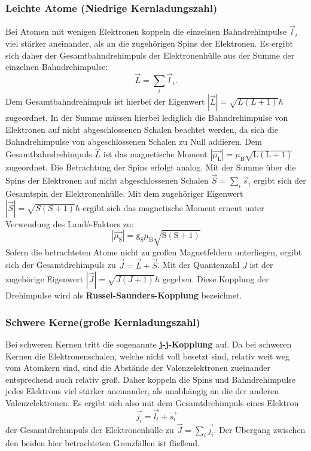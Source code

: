 \subsubsection{Leichte Atome (Niedrige Kernladungszahl)}
Bei Atomen mit wenigen Elektronen koppeln die einzelnen Bahndrehimpulse $\vec{l}_i$ viel stärker aneinander, als an die zugehörigen Spins der Elektronen. Es ergibt sich daher der Gesamtbahndrehimpuls der Elektronenhülle aus der Summe der einzelnen Bahndrehimpulse:
\begin{equation}
  \vec{L}=\sum_i{\vec{l}_i}\mathrm{.}
\end{equation}
Dem Gesamtbahndrehimpuls ist hierbei der Eigenwert $|\vec{L}|=\sqrt{L\left(L+1\right)} \hbar$ zugeordnet.
In der Summe müssen hierbei lediglich die Bahndrehimpulse von Elektronen auf nicht abgeschlossenen Schalen beachtet werden, da sich die Bahndrehimpulse von abgeschlossenen Schalen zu Null addieren.
Dem Gesamtbahndrehimpuls $\vec{L}$ ist das magnetische Moment $|\vec{\mu_{\mathrm{L}}}|=\mu_{\mathrm{B}}\sqrt{\mathrm{L}\left(\mathrm{L}+1\right)}$ zugeordnet.
Die Betrachtung der Spins erfolgt analog. Mit der Summe über die Spins der Elektronen auf nicht abgeschlossenen Schalen $\vec{S}=\sum_i{\vec{s}_i}$
ergibt sich der Gesamtspin der Elektronenhülle.
Mit dem zugehöriger Eigenwert $|\vec{S}|=\sqrt{S\left(S+1\right)}\hbar$
ergibt sich das magnetische Moment erneut unter Verwendung des Landé-Faktors zu:
\begin{equation}
  |\vec{\mu_{\mathrm{S}}}|=\mathrm{g_S}\mu_{\mathrm{B}}\sqrt{\mathrm{S}\left(\mathrm{S}+1\right)}
\end{equation}
Sofern die betrachteten Atome nicht zu großen Magnetfeldern unterliegen, ergibt sich der Gesamtdrehimpuls zu $\vec{J}=\vec{L}+\vec{S}$.
Mit der Quantenzahl $J$ ist der zugehörige Eigenwert $|\vec{J}|=\sqrt{J(J+1)}\hbar$ gegeben.
Diese Kopplung der Drehimpulse wird als \textbf{Russel-Saunders-Kopplung} bezeichnet.
\subsubsection{Schwere Kerne(große Kernladungszahl)}
Bei schweren Kernen tritt die sogenannte \textbf{j-j-Kopplung} auf.
Da bei schweren Kernen die Elektronenschalen, welche nicht voll besetzt sind, relativ weit weg vom Atomkern sind, sind die Abstände der Valenzelektronen zueinander entsprechend auch relativ groß. Daher koppeln die Spins und Bahndrehimpulse jedes Elektrons viel stärker aneinander, als unabhängig an die der anderen Valenzelektronen.
Es ergibt sich also mit dem Gesamtdrehimpuls eines Elektron
\begin{equation}
  \vec{j_i}=\vec{l_i}+\vec{s_i}
\end{equation}
der Gesamtdrehimpuls der Elektronenhülle zu $\vec{J}=\sum_i{\vec{j_i}}$.
Der Übergang zwischen den beiden hier betrachteten Grenzfällen ist fließend.

